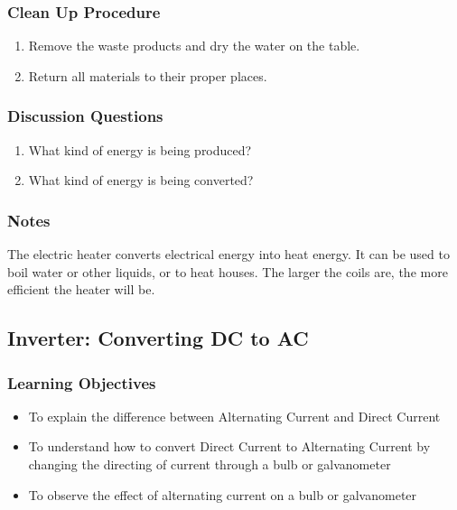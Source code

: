 \subsubsection*{Clean Up Procedure}
\begin{enumerate}
\item{Remove the waste products and dry the water on the table.} 
\item{Return all materials to their proper places.} 
\end{enumerate}

\subsubsection*{Discussion Questions}
\begin{enumerate}
\item{What kind of energy is being produced?}
\item{What kind of energy is being converted?}
\end{enumerate}

\subsubsection*{Notes}
The electric heater converts electrical energy into heat energy. It can be used to boil water or other liquids, or to heat houses. The larger the coils are, the more efficient the heater will be.  


\subsection{Inverter: Converting DC to AC}

\subsubsection*{Learning Objectives}
\begin{itemize}
\item{To explain the difference between Alternating Current and Direct Current} 
\item{To understand how to convert Direct Current to Alternating Current by changing the directing of current through a bulb or galvanometer} 
\item{To observe the effect of alternating current on a bulb or galvanometer} 
\end{itemize}

